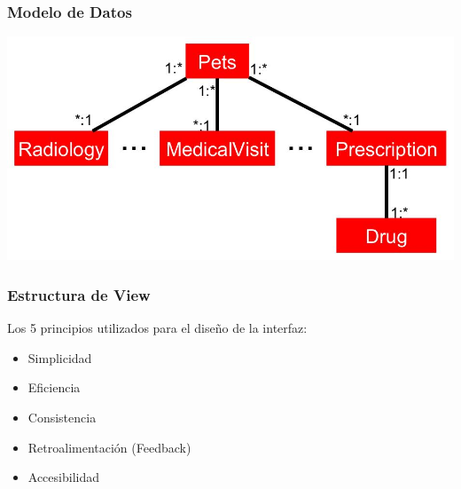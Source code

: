 \documentclass[14pt]{beamer}
\begin{document}
\begin{frame}
\frametitle{Modelo de Datos}

\begin{center}

\includegraphics[scale =0.35]{Images/symplifiedClass.jpg}

\end{center}


\end{frame}


\begin{frame}
\frametitle{Estructura de View}
Los 5 principios utilizados para el diseño de la interfaz:
\begin{itemize}
\item Simplicidad
\item Eficiencia
\item Consistencia
\item Retroalimentación (Feedback)
\item Accesibilidad
\end{itemize}

\end{frame}
\end{document}
